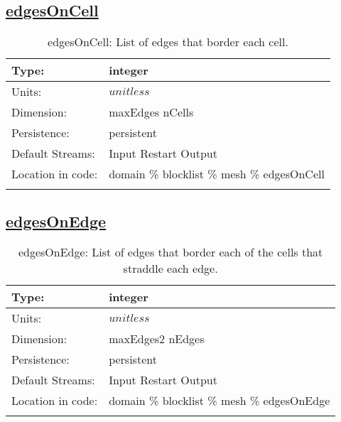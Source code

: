 \subsection[edgesOnCell]{\hyperref[sec:var_tab_mesh]{edgesOnCell}}
\label{subsec:var_sec_mesh_edgesOnCell}
\begin{center}
\begin{longtable}{| p{2.0in} | p{4.0in} |}
        \hline 
        Type: & integer \\
        \hline 
        Units: & $unitless$ \\
        \hline 
        Dimension: & maxEdges nCells \\
        \hline 
        Persistence: & persistent \\
        \hline 
		 Default Streams: & Input Restart Output  \\
        \hline 
		 Location in code: & domain \% blocklist \% mesh \% edgesOnCell \\
		 \hline 
    \caption{edgesOnCell: List of edges that border each cell.}
\end{longtable}
\end{center}
\subsection[edgesOnEdge]{\hyperref[sec:var_tab_mesh]{edgesOnEdge}}
\label{subsec:var_sec_mesh_edgesOnEdge}
\begin{center}
\begin{longtable}{| p{2.0in} | p{4.0in} |}
        \hline 
        Type: & integer \\
        \hline 
        Units: & $unitless$ \\
        \hline 
        Dimension: & maxEdges2 nEdges \\
        \hline 
        Persistence: & persistent \\
        \hline 
		 Default Streams: & Input Restart Output  \\
        \hline 
		 Location in code: & domain \% blocklist \% mesh \% edgesOnEdge \\
		 \hline 
    \caption{edgesOnEdge: List of edges that border each of the cells that straddle each edge.}
\end{longtable}
\end{center}

